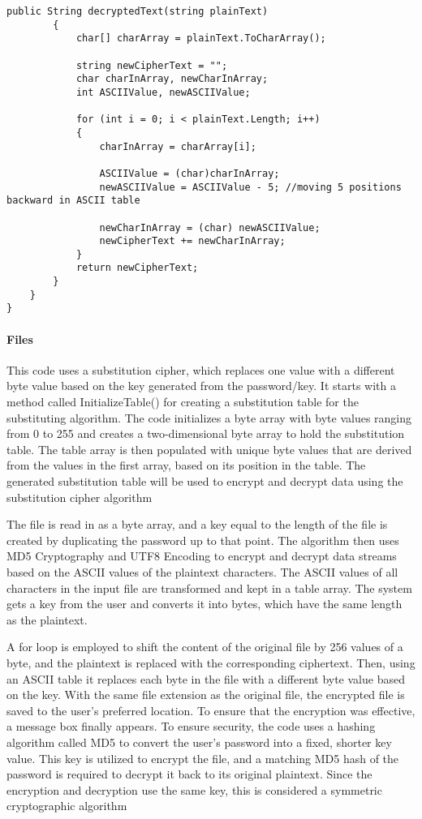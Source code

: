 \begin{lstlisting}[caption=B\&G Cipher Text Source Code]
        public String decryptedText(string plainText)
        {
            char[] charArray = plainText.ToCharArray();

            string newCipherText = "";
            char charInArray, newCharInArray;
            int ASCIIValue, newASCIIValue;

            for (int i = 0; i < plainText.Length; i++)
            {
                charInArray = charArray[i];

                ASCIIValue = (char)charInArray;
                newASCIIValue = ASCIIValue - 5; //moving 5 positions backward in ASCII table

                newCharInArray = (char) newASCIIValue;
                newCipherText += newCharInArray;
            }
            return newCipherText;
        }
    }
}
\end{lstlisting}

\paragraph{Files\\}

This code uses a substitution cipher, which replaces one value with a different byte value based on the key generated from the password/key. 
It starts with a method called InitializeTable() for creating a substitution table for the substituting algorithm. The code initializes a byte array with byte values ranging from 0 to 255 and creates a two-dimensional byte array to hold the substitution table. The table array is then populated with unique byte values that are derived from the values in the first array, based on its position in the table. The generated substitution table will be used to encrypt and decrypt data using the substitution cipher algorithm

The file is read in as a byte array, and a key equal to the length of the file is created by duplicating the password up to that point. The algorithm then uses MD5 Cryptography and UTF8 Encoding to encrypt and decrypt data streams based on the ASCII values of the plaintext characters. The ASCII values of all characters in the input file are transformed and kept in a table array. The system gets a key from the user and converts it into bytes, which have the same length as the plaintext. 

A for loop is employed to shift the content of the original file by 256 values of a byte, and the plaintext is replaced with the corresponding ciphertext. Then, using an ASCII table it replaces each byte in the file with a different byte value based on the key. With the same file extension as the original file, the encrypted file is saved to the user's preferred location. To ensure that the encryption was effective, a message box finally appears.
To ensure security, the code uses a hashing algorithm called MD5 to convert the user's password into a fixed, shorter key value. This key is utilized to encrypt the file, and a matching MD5 hash of the password is required to decrypt it back to its original plaintext. Since the encryption and decryption use the same key, this is considered a symmetric cryptographic algorithm

